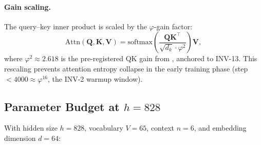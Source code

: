 \paragraph{Gain scaling.}
The query--key inner product is scaled by the $\varphi$-gain factor:
\begin{equation}\label{eq:ch24-gain}
  \mathrm{Attn}(\mathbf{Q}, \mathbf{K}, \mathbf{V}) =
    \mathrm{softmax}\!\left(\frac{\mathbf{Q}\mathbf{K}^\top}{\sqrt{d_k}\cdot\varphi^2}\right)\mathbf{V},
\end{equation}
where $\varphi^2 \approx 2.618$ is the pre-registered QK gain from
\cite{trios_gate_preregistration}, anchored to INV-13.  This rescaling prevents
attention entropy collapse in the early training phase (step $< 4000 \approx
\varphi^{16}$, the INV-2 warmup window).

\subsection{Parameter Budget at \texorpdfstring{$h = 828$}{h=828}}
\label{subsec:ch24-param-budget}

With hidden size $h = 828$, vocabulary $V = 65$, context $n = 6$, and
embedding dimension $d = 64$:

\begin{table}[htb]
\centering
\caption{Parameter budget of the champion IGLA architecture.  All widths are
         multiples of $\varphi$-derived bases.  Total is approximate due to
         bias terms.}
\label{tab:ch24-param-budget}
\end{table}

